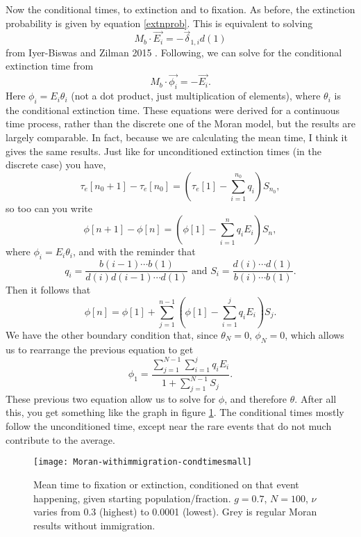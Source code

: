 Now the conditional times, to extinction and to fixation. 
As before, the extinction probability is given by equation \ref{extnprob}. 
This is equivalent to solving
\begin{equation}
M_b \cdot \vec{E_i} = -\vec{\delta}_{1,i}d(1)
\end{equation}
from Iyer-Biswas and Zilman 2015 \cite{Iyer-Biswas2015}. 
Following, we can solve for the conditional extinction time from
\begin{equation}
M_b \cdot \vec{\phi_i} = -\vec{E_i}. 
\end{equation}%
Here $\phi_i = E_i \theta_i$ (not a dot product, just multiplication of elements), where $\theta_i$ is the conditional extinction time. 
These equations were derived for a continuous time process, rather than the discrete one of the Moran model, but the results are largely comparable. In fact, because we are calculating the mean time, I think it gives the same results. 
Just like for unconditioned extinction times (in the discrete case) you have,
\begin{equation*}
\tau_e[n_0+1] - \tau_e[n_0] = \left(\tau_e[1] - \sum_{i=1}^{n_0}q_i\right)S_{n_0},
\end{equation*}
so too can you write
\begin{equation}
\phi[n+1] - \phi[n] = \left(\phi[1] - \sum_{i=1}^{n}q_iE_i\right)S_{n},
\end{equation}
where $\phi_i = E_i\theta_i$, and with the reminder that
\begin{equation*}
q_i = \frac{b(i-1)\cdots b(1)}{d(i)d(i-1)\cdots d(1)} \text{  and  } S_i = \frac{d(i)\cdots d(1)}{b(i)\cdots b(1)}. 
\end{equation*}
Then it follows that
\begin{equation}
\phi[n] = \phi[1] + \sum_{j=1}^{n-1}\left(\phi[1] - \sum_{i=1}^{j}q_iE_i\right)S_{j}.  
\end{equation}
We have the other boundary condition that, since $\theta_N = 0$, $\phi_N = 0$, which allows us to rearrange the previous equation to get
\begin{equation}
\phi_1 = \frac{\sum_{j=1}^{N-1}\sum_{i=1}^{j}q_iE_i}{1+\sum_{j=1}^{N-1}S_j}. 
\end{equation}
These previous two equation allow us to solve for $\phi$, and therefore $\theta$. 
After all this, you get something like the graph in figure \ref{condextntimefig}. 
The conditional times mostly follow the unconditioned time, except near the rare events that do not much contribute to the average. 
\begin{figure}[ht]
	\centering
	\texttt{[image: Moran-withimmigration-condtimesmall]}
	\caption{Mean time to fixation or extinction, conditioned on that event happening, given starting population/fraction. $g=0.7$, $N=100$, $\nu$ varies from 0.3 (highest) to 0.0001 (lowest). Grey is regular Moran results without immigration. } \label{condextntimefig}
\end{figure}

